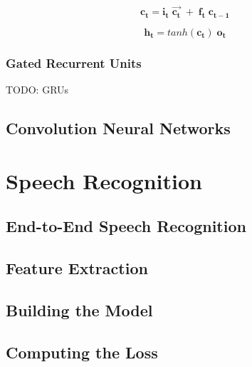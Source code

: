 



\begin{equation}
\label{eq:11}
\mathbf{c_t} = \mathbf{i_t } \; \mathbf{\vec{c_t}} \; + \;  \mathbf{f_t} \; \mathbf{c_{t-1}}
\end{equation}

\begin{equation}
\label{eq:12}
\mathbf{h_t} = tanh(\mathbf{c_t}) \; \mathbf{o_t}
\end{equation}




\subsubsection{Gated Recurrent Units}
\label{bg:subsub6}
TODO: \ac{GRUs}


\subsection{Convolution Neural Networks} 
\label{bg:sub3}



\section{Speech Recognition} \label{bg:s3}
\subsection{End-to-End Speech Recognition} 
\label{bg:sub4}
\subsection{Feature Extraction} 
\label{bg:sub5}
\subsection{Building the Model} 
\label{bg:sub6}
\subsection{Computing the Loss} 
\label{bg:sub7}



